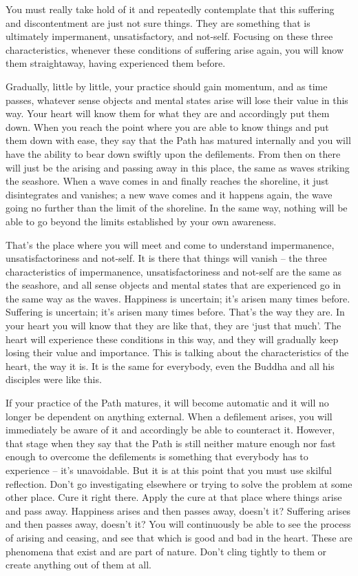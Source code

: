 You must really take hold of it and repeatedly contemplate that this
suffering and discontentment are just not sure things. They are
something that is ultimately impermanent, unsatisfactory, and not-self. 
Focusing on these three characteristics, whenever these conditions of
suffering arise again, you will know them straightaway, having
experienced them before. 

Gradually, little by little, your practice should gain momentum, and as
time passes, whatever sense objects and mental states arise will lose
their value in this way. Your heart will know them for what they are and
accordingly put them down. When you reach the point where you are able
to know things and put them down with ease, they say that the Path has
matured internally and you will have the ability to bear down swiftly
upon the defilements. From then on there will just be the arising and
passing away in this place, the same as waves striking the seashore. 
When a wave comes in and finally reaches the shoreline, it just
disintegrates and vanishes; a new wave comes and it happens again, the
wave going no further than the limit of the shoreline. In the same way, 
nothing will be able to go beyond the limits established by your own
awareness. 

That's the place where you will meet and come to understand
impermanence, unsatisfactoriness and not-self. It is there that things
will vanish -- the three characteristics of impermanence, 
unsatisfactoriness and not-self are the same as the seashore, and all
sense objects and mental states that are experienced go in the same way
as the waves. Happiness is uncertain; it's arisen many times before. 
Suffering is uncertain; it's arisen many times before. That's the way
they are. In your heart you will know that they are like that, they are
`just that much'. The heart will experience these conditions in this
way, and they will gradually keep losing their value and importance. 
This is talking about the characteristics of the heart, the way it is. 
It is the same for everybody, even the Buddha and all his disciples were
like this. 

If your practice of the Path matures, it will become automatic and it
will no longer be dependent on anything external. When a defilement
arises, you will immediately be aware of it and accordingly be able to
counteract it. However, that stage when they say that the Path is still
neither mature enough nor fast enough to overcome the defilements is
something that everybody has to experience -- it's unavoidable. But it
is at this point that you must use skilful reflection. Don't go
investigating elsewhere or trying to solve the problem at some other
place. Cure it right there. Apply the cure at that place where things
arise and pass away. Happiness arises and then passes away, doesn't it? 
Suffering arises and then passes away, doesn't it? You will continuously
be able to see the process of arising and ceasing, and see that which is
good and bad in the heart. These are phenomena that exist and are part
of nature. Don't cling tightly to them or create anything out of them at
all. 

